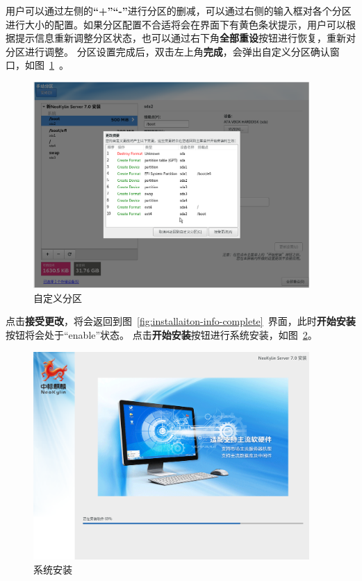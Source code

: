\documentclass[a4paper]{ctexart}
\begin{document}
用户可以通过左侧的\textbf{“+”“-”}进行分区的删减，可以通过右侧的输入框对各个分区进行大小的配置。如果分区配置不合适将会在界面下有黄色条状提示，用户可以根据提示信息重新调整分区状态，也可以通过右下角\textbf{全部重设}按钮进行恢复，重新对分区进行调整。
分区设置完成后，双击左上角\textbf{完成}，会弹出自定义分区确认窗口，如图~\ref{fig:partation-custom-confirm}~。
 
\begin{figure}[ht]
	\centering
	\includegraphics[width=10.5cm]{ns7/partation-custom-confirm}
	\caption{自定义分区}\label{fig:partation-custom-confirm}
\end{figure}
	  
点击\textbf{接受更改}，将会返回到图~\ref{fig:installaiton-info-complete}~界面，此时\textbf{开始安装}按钮将会处于“enable”状态。
点击\textbf{开始安装}按钮进行系统安装，如图~\ref{fig:installation-progress}。

\begin{figure}[htp]
	\centering
	\includegraphics[width=10.5cm]{ns7/installation-progress}
	\caption{系统安装}\label{fig:installation-progress}
\end{figure} 
\end{document}

